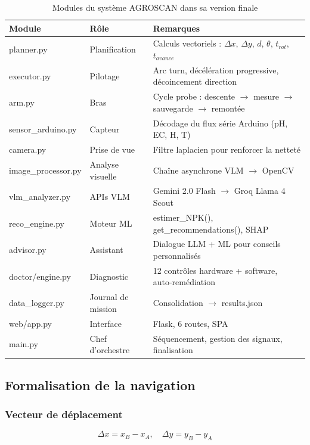 \documentclass[a4paper,12pt,openany,titlepage]{scrartcl}
\begin{document}
\begin{table}[H]
\centering
\begin{tabular}{|l|l|p{6cm}|}
\hline
\textbf{Module} & \textbf{Rôle} & \textbf{Remarques} \\
\hline
planner.py & Planification & Calculs vectoriels : $\Delta x$, $\Delta y$, $d$, $\theta$, $t_{rot}$, $t_{avance}$ \\
executor.py & Pilotage & Arc turn, décélération progressive, décoincement direction \\
arm.py & Bras & Cycle probe : descente $\rightarrow$ mesure $\rightarrow$ sauvegarde $\rightarrow$ remontée \\
sensor\_arduino.py & Capteur & Décodage du flux série Arduino (pH, EC, H, T) \\
camera.py & Prise de vue & Filtre laplacien pour renforcer la netteté \\
image\_processor.py & Analyse visuelle & Chaîne asynchrone VLM $\rightarrow$ OpenCV \\
vlm\_analyzer.py & APIs VLM & Gemini 2.0 Flash $\rightarrow$ Groq Llama 4 Scout \\
reco\_engine.py & Moteur ML & estimer\_NPK(), get\_recommendations(), SHAP \\
advisor.py & Assistant & Dialogue LLM + ML pour conseils personnalisés \\
doctor/engine.py & Diagnostic & 12 contrôles hardware + software, auto‑remédiation \\
data\_logger.py & Journal de mission & Consolidation $\rightarrow$ results.json \\
web/app.py & Interface & Flask, 6 routes, SPA \\
main.py & Chef d’orchestre & Séquencement, gestion des signaux, finalisation \\
\hline
\end{tabular}
\caption{Modules du système AGROSCAN dans sa version finale}
\end{table}

\subsection{Formalisation de la navigation}

\subsubsection{Vecteur de déplacement}
\begin{equation}
\Delta x = x_B - x_A, \quad \Delta y = y_B - y_A
\end{equation}
\end{document}
